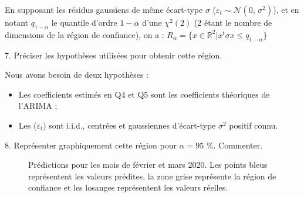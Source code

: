 \documentclass[a4paper, 12pt]{article} %
\begin{document}
{En supposant les résidus gaussiens de même écart-type $\sigma$ ($\varepsilon_t \sim \mathcal{N}(0,\,\sigma^{2})$),  et en notant $q_{1- \alpha}$ le quantile d'ordre $1 - \alpha$ d'une ${\chi}^2(2)$ (2 étant le nombre de dimensions de la région de confiance), on a : \textbf{$R_{\alpha} = \lbrace x \in \mathbb{R}^2 | x^t \sigma x \leqslant q_{1-\alpha} \rbrace$ }}
\\
\begin{tcolorbox}
{\small
7. Préciser les hypothèses utilisées pour obtenir cette région.
}
\end{tcolorbox}
\normalsize{
{Nous avons besoin de deux hypothèses :
\begin{itemize}
\item Les coefficients estimés en Q4 et Q5 sont les coefficients théoriques de l'ARIMA ;
\item Les ($\varepsilon_t$) sont i.i.d., centrées et gaussiennes d'écart-type $\sigma^2$ positif connu.
\end{itemize}}}
\begin{tcolorbox}
{\small
8. Représenter graphiquement cette région pour $\alpha = 95$ \%. Commenter.
}
\end{tcolorbox}
\begin{figure}[h]
    \centering
    \caption{Prédictions pour les mois de février et mars 2020. Les points bleus représentent les valeurs prédites, la zone grise représente la région de confiance et les losanges représentent les valeurs réelles.}
\end{figure}
\end{document}
